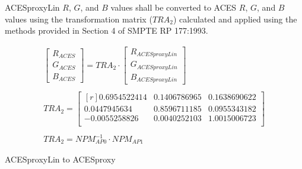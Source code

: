 ACESproxyLin $R$, $G$, and $B$ values shall be converted to ACES $R$, $G$, and $B$ values using the transformation matrix ($TRA_{2}$) calculated and applied using the methods provided in Section 4 of SMPTE RP 177:1993.


\begin{floatequ} 
\begin{gather}
    \begin{bmatrix}
        R_{ACES}\\
        G_{ACES}\\
        B_{ACES}
    \end{bmatrix}
    =
    TRA_{2}
    \cdot
    \begin{bmatrix}
        R_{ACESproxyLin}\\
        G_{ACESproxyLin}\\
        B_{ACESproxyLin}
    \end{bmatrix} \\
    \\
    TRA_{2} =
    \begin{bmatrix*}[r]
        0.6954522414 & 0.1406786965 & 0.1638690622 \\
        0.0447945634 & 0.8596711185 & 0.0955343182 \\
        -0.0055258826 & 0.0040252103 & 1.0015006723 \\
    \end{bmatrix*} \\
    \\
    TRA_{2} = NPM^{-1}_{AP0} \cdot NPM_{AP1}
\end{gather}
\caption{ACESproxyLin to ACESproxy}
\label{eq:ACESproxyLin2ACES12}
\end{floatequ}